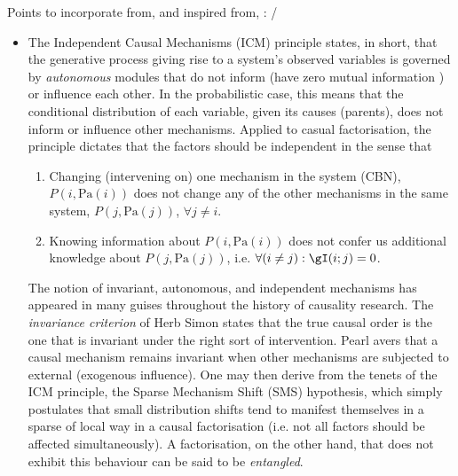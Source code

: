 Points to incorporate from, and inspired from, \cite{scholkopf2021toward}:
%
/\begin{itemize}
  \item 
    The Independent Causal Mechanisms (ICM) principle states, in short, that the generative process
    giving rise to a system's observed variables is governed by \emph{autonomous} modules that do
    not inform (have zero mutual information \wrt{}) or influence each other.
    In the probabilistic case, this means that the conditional distribution of each variable, given
    its causes (parents), does not inform or influence other mechanisms.
    Applied to casual factorisation, the principle dictates that the factors should be independent
    in the sense that 
    \begin{enumerate}
      \item Changing (intervening on) one mechanism in the system (CBN), \(P(i, \text{Pa}(i))\)
        does not change any of the other mechanisms in the same system, \(P(j, \text{Pa}(j))\),
        \(\forall j \neq i \).
      \item Knowing information about \(P(i, \text{Pa}(i))\) does not confer us additional
        knowledge about \(P(j, \text{Pa}(j))\), i.e. \( \forall (i \neq j): \gI(i; j) = 0 \).
    \end{enumerate}
    The notion of invariant, autonomous, and independent mechanisms has appeared in many guises
    throughout the history of causality research.
    The \emph{invariance criterion} of Herb Simon states that the true causal order is the one that
    is invariant under the right sort of intervention.
    Pearl avers that a causal mechanism remains invariant when other mechanisms are subjected to
    external (exogenous influence).
    One may then derive from the tenets of the ICM principle, the Sparse Mechanism Shift (SMS)
    hypothesis, which simply postulates that small distribution shifts tend to manifest themselves
    in a sparse of local way in a causal factorisation (i.e. not all factors should be affected
    simultaneously).
    A factorisation, on the other hand, that does not exhibit this behaviour can be said to be
    \emph{entangled}.


\end{itemize}
